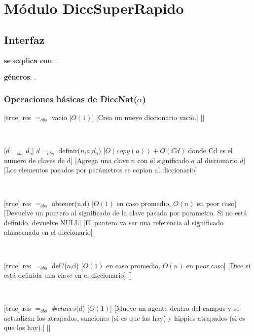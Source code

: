 \section{Módulo DiccSuperRapido}

\subsection{Interfaz}

\textbf{se explica con}: .

\textbf{géneros}: .

\subsubsection{Operaciones básicas de DiccNat($\alpha$)}

[true]
{res $=_{obs}$ vacio}
[$O(1)$]
[Crea un nuevo diccionario vacio.]
[]

~

[$d =_{obs} d_o$]
{$d =_{obs}$ definir($n$,$a$,$d_o$)}
[$O(copy(a)) + O(Cd)$ donde Cd es el numero de claves de d]
[Agrega una clave $n$ con el significado $a$ al diccionario $d$]
[Los elementos pasados por parámetros se copian al diccionario]

~

[true]
{res $=_{obs}$ obtener(n,d)}
[$O(1)$ en caso promedio, $O(n)$ en peor caso]
[Devuelve un puntero al significado de la clave pasada por parametro. Si no está definido, devuelve NULL]
[El puntero va ser una referencia al significado almacenado en el diccionario]

~

[true]
{res $=_{obs}$ def?(a,d)}
[$O(1)$ en caso promedio, $O(n)$ en peor caso]
[Dice si está definida una clave en el diccionario]
[]

~

[true]
{res $=_{obs}$ $ \# claves$($d$)}
[$O(1)$]
[Mueve un agente dentro del campus y se actualizan los atrapados, sanciones (si es que las hay) y hippies atrapados (si es que los hay).]
[]

~

